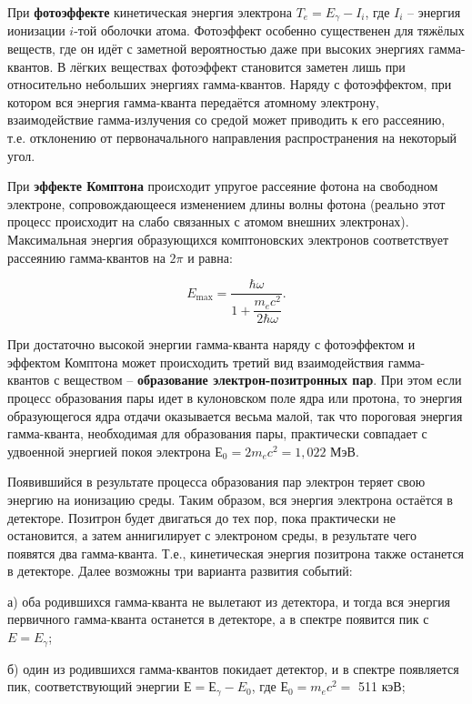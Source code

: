 \documentclass[a4paper,12pt]{article} %
\begin{document}
При \textbf{фотоэффекте} кинетическая энергия электрона $ T_e = E_\gamma - I_i $, где $ I_i $ -- энергия ионизации $ i $-той оболочки атома. Фотоэффект особенно существенен для тяжёлых веществ, где он идёт с заметной вероятностью даже при высоких энергиях гамма-квантов. В лёгких веществах фотоэффект становится заметен лишь при относительно небольших энергиях гамма-квантов. Наряду с фотоэффектом, при котором вся энергия гамма-кванта передаётся атомному электрону, взаимодействие гамма-излучения со средой может приводить к его рассеянию, т.е. отклонению от первоначального направления распространения на некоторый угол.
	
При \textbf{эффекте Комптона} происходит упругое рассеяние фотона на свободном электроне, сопровождающееся изменением длины волны фотона (реально этот процесс происходит на слабо связанных с атомом внешних электронах). Максимальная энергия образующихся комптоновских электронов соответствует рассеянию гамма-квантов на $ 2\pi $ и равна:
	
	\begin{equation}
	E_{\max} = \dfrac{\hbar \omega}{1 + \dfrac{m_ec^2}{2\hbar\omega}}.
	\label{e:compton}
	\end{equation}
	
При достаточно высокой энергии гамма-кванта наряду с фотоэффектом и эффектом Комптона может происходить третий вид взаимодействия гамма-квантов с веществом – \textbf{образование электрон-позитронных пар}. При этом если процесс образования пары идет в кулоновском поле ядра или протона, то энергия образующегося ядра отдачи оказывается весьма малой, так что пороговая энергия гамма-кванта, необходимая для образования пары, практически совпадает с удвоенной энергией покоя электрона $Е_0 = 2m_ec^2 =1,022$ МэВ.
	
Появившийся в результате процесса образования пар электрон теряет свою энергию на ионизацию среды. Таким образом, вся энергия электрона остаётся в детекторе. Позитрон будет двигаться до тех пор, пока практически не остановится, а затем аннигилирует с электроном среды, в результате чего появятся два гамма-кванта. Т.е., кинетическая энергия позитрона также останется в детекторе. Далее возможны три варианта развития событий:
	
	а) оба родившихся гамма-кванта не вылетают из детектора, и тогда вся энергия первичного гамма-кванта останется в детекторе, а в спектре появится пик с $E = E_\gamma$;
	
	б) один из родившихся гамма-квантов покидает детектор, и в спектре появляется пик, соответствующий энергии $ Е = Е_\gamma - E_0$, где $ Е_0 = m_ec^2 = $ 511 кэВ;
	
\end{document}
